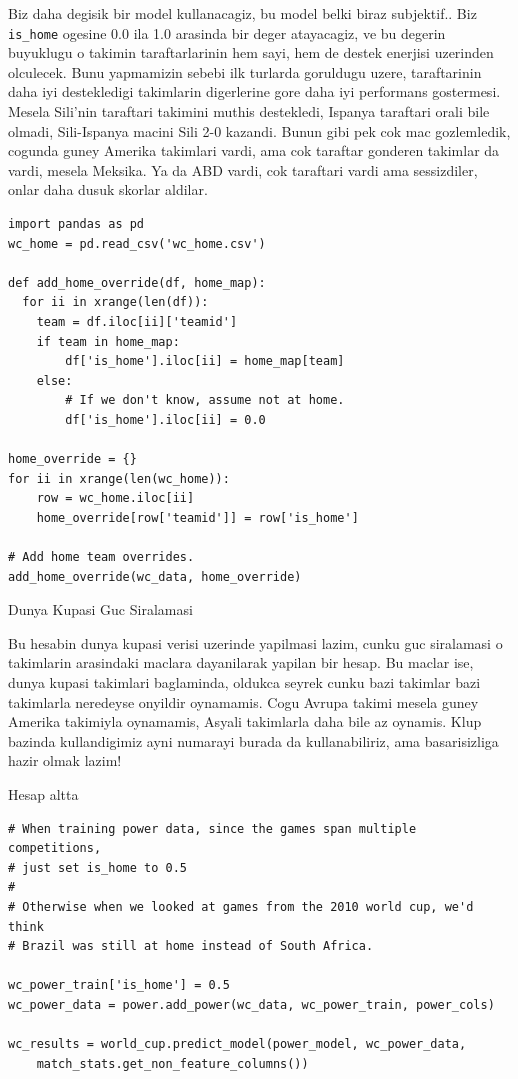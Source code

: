 \documentclass[12pt,fleqn]{article}\usepackage{../common}
\begin{document}
Biz daha degisik bir model kullanacagiz, bu model belki biraz
subjektif.. Biz \verb!is_home! ogesine 0.0 ila 1.0 arasinda bir deger
atayacagiz, ve bu degerin buyuklugu o takimin taraftarlarinin hem sayi, hem
de destek enerjisi uzerinden olculecek. Bunu yapmamizin sebebi ilk turlarda
goruldugu uzere, taraftarinin daha iyi destekledigi takimlarin digerlerine
gore daha iyi performans gostermesi. Mesela Sili'nin taraftari takimini
muthis destekledi, Ispanya taraftari orali bile olmadi, Sili-Ispanya macini
Sili 2-0 kazandi. Bunun gibi pek cok mac gozlemledik, cogunda guney Amerika
takimlari vardi, ama cok taraftar gonderen takimlar da vardi, mesela
Meksika. Ya da ABD vardi, cok taraftari vardi ama sessizdiler, onlar daha
dusuk skorlar aldilar.

\begin{verbatim}
import pandas as pd
wc_home = pd.read_csv('wc_home.csv')

def add_home_override(df, home_map):
  for ii in xrange(len(df)):
    team = df.iloc[ii]['teamid']
    if team in home_map:
        df['is_home'].iloc[ii] = home_map[team]
    else:
        # If we don't know, assume not at home.
        df['is_home'].iloc[ii] = 0.0
        
home_override = {}
for ii in xrange(len(wc_home)):
    row = wc_home.iloc[ii]
    home_override[row['teamid']] = row['is_home']

# Add home team overrides.
add_home_override(wc_data, home_override)    
\end{verbatim}

Dunya Kupasi Guc Siralamasi

Bu hesabin dunya kupasi verisi uzerinde yapilmasi lazim, cunku guc
siralamasi o takimlarin arasindaki maclara dayanilarak yapilan bir
hesap. Bu maclar ise, dunya kupasi takimlari baglaminda, oldukca seyrek
cunku bazi takimlar bazi takimlarla neredeyse onyildir oynamamis. Cogu
Avrupa takimi mesela guney Amerika takimiyla oynamamis, Asyali takimlarla
daha bile az oynamis. Klup bazinda kullandigimiz ayni numarayi burada da
kullanabiliriz, ama basarisizliga hazir olmak lazim! 

Hesap altta

\begin{verbatim}
# When training power data, since the games span multiple competitions, 
# just set is_home to 0.5
#
# Otherwise when we looked at games from the 2010 world cup, we'd think 
# Brazil was still at home instead of South Africa.

wc_power_train['is_home'] = 0.5
wc_power_data = power.add_power(wc_data, wc_power_train, power_cols)

wc_results = world_cup.predict_model(power_model, wc_power_data, 
    match_stats.get_non_feature_columns())
\end{verbatim}
\end{document}
